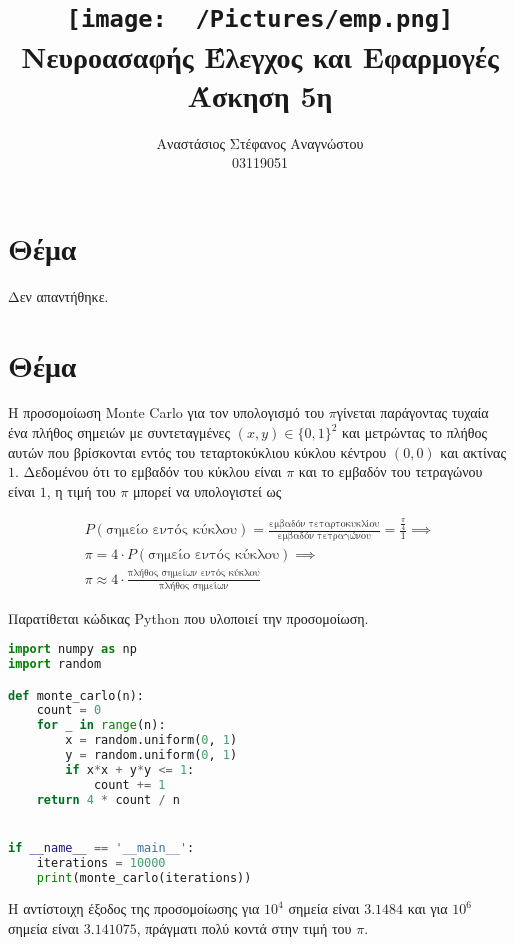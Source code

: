 \documentclass{article}
\title{
    \texttt{[image: ~/Pictures/emp.png]} \\
    \vskip 5cm
    Νευροασαφής Έλεγχος και Εφαρμογές\\
    \large Άσκηση 5η
    \vskip 5cm
}
\author{Αναστάσιος Στέφανος Αναγνώστου\\
        03119051}
\newcommand{\eng}[1]{\foreignlanguage{english}{#1}} %
\begin{document}
\maketitle
\newpage
\tableofcontents
\newpage

\section{Θέμα}

Δεν απαντήθηκε.

\clearpage
\section{Θέμα}

Η προσομοίωση \eng{Monte Carlo} για τον υπολογισμό του $\pi$γίνεται παράγοντας
τυχαία ένα πλήθος σημειών με συντεταγμένες $(x, y) \in \{0, 1\}^2$ και
μετρώντας το πλήθος αυτών που βρίσκονται εντός του τεταρτοκύκλιου κύκλου
κέντρου $(0, 0)$ και ακτίνας $1$. Δεδομένου ότι το εμβαδόν του κύκλου είναι
$\pi$ και το εμβαδόν του τετραγώνου είναι $1$, η τιμή του $\pi$ μπορεί να
υπολογιστεί ως

\begin{equation}
    \begin{gathered}
    P(\text{σημείο εντός κύκλου}) = \frac{\text{εμβαδόν τεταρτοκυκλίου}}{\text{εμβαδόν τετραγώνου}} = \frac{\frac{\pi}{4}}{1} \implies \\
    \pi = 4 \cdot P(\text{σημείο εντός κύκλου}) \implies \\
    \pi \approx 4 \cdot \frac{\text{πλήθος σημείων εντός κύκλου}}{\text{πλήθος σημείων}}
    \end{gathered}
\end{equation}

Παρατίθεται κώδικας \eng{Python} που υλοποιεί την προσομοίωση.

\begin{lstlisting}[language=Python]
import numpy as np
import random

def monte_carlo(n):
    count = 0
    for _ in range(n):
        x = random.uniform(0, 1)
        y = random.uniform(0, 1)
        if x*x + y*y <= 1:
            count += 1
    return 4 * count / n


if __name__ == '__main__':
    iterations = 10000
    print(monte_carlo(iterations))
\end{lstlisting}

Η αντίστοιχη έξοδος της προσομοίωσης για $10^4$ σημεία είναι $3.1484$ και για
$10^6$ σημεία είναι $3.141075$, πράγματι πολύ κοντά στην τιμή του $\pi$.
\end{document}
